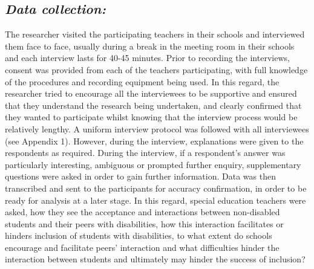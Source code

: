 \documentclass[11.5pt]{sig-alternate}
\begin{document}
\begin{large}
\subsection*{\textit{Data collection:}}
The researcher visited the participating teachers in their schools and interviewed them face to face, usually during a break in the meeting room in their schools and each interview lasts for 40-45 minutes. Prior to recording the interviews, consent was provided from each of the teachers participating, with full knowledge of the procedures and recording equipment being used. In this regard, the researcher tried to encourage all the interviewees to be supportive and ensured that they understand the research being undertaken, and clearly confirmed that they wanted to participate whilst knowing that the interview process would be relatively lengthy. A uniform interview protocol was followed with all interviewees (see Appendix 1). However, during the interview, explanations were given to the respondents as required. During the interview, if a respondent’s answer was particularly interesting, ambiguous or prompted further enquiry, supplementary questions were asked in order to gain further information.  Data was then transcribed and sent to the participants for accuracy confirmation, in order to be ready for analysis at a later stage. In this regard, special education teachers were asked, how they see the acceptance and interactions between non-disabled students and their peers with disabilities, how this interaction facilitates or hinders inclusion of students with disabilities, to what extent do schools encourage and facilitate peers’ interaction and what difficulties hinder the interaction between students and ultimately may hinder the success of inclusion? 


\end{large}
\end{document}
